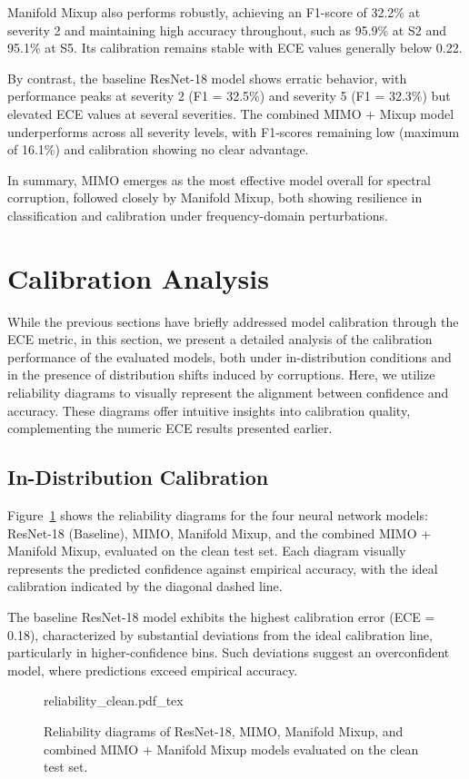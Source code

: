 Manifold Mixup also performs robustly, achieving an F1-score of 32.2\% at severity 2 and maintaining high accuracy throughout, such as 95.9\% at S2 and 95.1\% at S5. Its calibration remains stable with ECE values generally below 0.22.

By contrast, the baseline ResNet-18 model shows erratic behavior, with performance peaks at severity 2 (F1 = 32.5\%) and severity 5 (F1 = 32.3\%) but elevated ECE values at several severities. The combined MIMO + Mixup model underperforms across all severity levels, with F1-scores remaining low (maximum of 16.1\%) and calibration showing no clear advantage.

In summary, MIMO emerges as the most effective model overall for spectral corruption, followed closely by Manifold Mixup, both showing resilience in classification and calibration under frequency-domain perturbations.





\section{Calibration Analysis}
While the previous sections have briefly addressed model calibration through the ECE metric, in this section, we present a detailed analysis of the calibration performance of the evaluated models, both under in-distribution conditions and in the presence of distribution shifts induced by corruptions. Here, we utilize reliability diagrams to visually represent the alignment between confidence and accuracy. These diagrams offer intuitive insights into calibration quality, complementing the numeric ECE results presented earlier.
\subsection{In-Distribution Calibration}
Figure~\ref{fig:clean_reliability} shows the reliability diagrams for the four neural network models: ResNet-18 (Baseline), MIMO, Manifold Mixup, and the combined MIMO + Manifold Mixup, evaluated on the clean test set. Each diagram visually represents the predicted confidence against empirical accuracy, with the ideal calibration indicated by the diagonal dashed line.

The baseline ResNet-18 model exhibits the highest calibration error (ECE = 0.18), characterized by substantial deviations from the ideal calibration line, particularly in higher-confidence bins. Such deviations suggest an overconfident model, where predictions exceed empirical accuracy.
\begin{figure}[h!]
	\centering
    \def\svgwidth{420pt}
 	{reliability_clean.pdf_tex} 
	\caption[Reliability diagrams for the clean test set] {Reliability diagrams of ResNet-18, MIMO, Manifold Mixup, and combined MIMO + Manifold Mixup models evaluated on the clean test set.}
	\label{fig:clean_reliability}
\end{figure}

